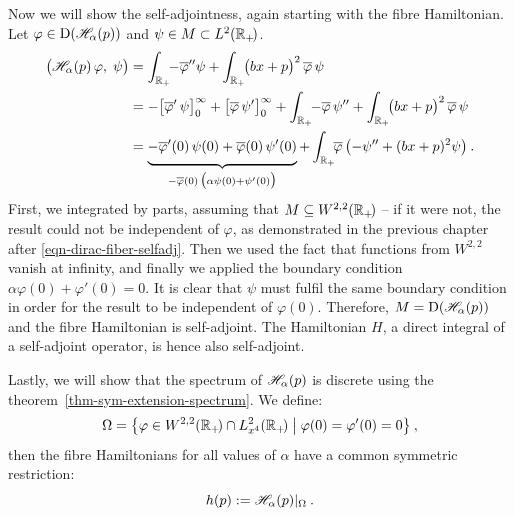 Now we will show the self-adjointness, again starting with the fibre Hamiltonian. Let $\varphi \in \mathrm{D}(\mathscr{H}_\alpha(p))$ and $\psi \in M \subset L^2(\mathbb{R}_+\!)$.
\begin{align*}
    \big(\Hf_\alpha(p) \, \varphi, \; \psi \big)
    &= \int_{\R_+}\!\! -\overline\varphi'' \psi + \int_{\R_+}\!\! \big(bx + p\big)^2 \, \overline\varphi \, \psi \\
    &= - \big[ \overline\varphi' \, \psi \big]_0^\infty
    + \big[ \overline\varphi \, \psi' \big]_0^\infty
    + \int_{\R_+}\!\! -\overline\varphi \, \psi'' + \int_{\R_+}\!\! \big(bx + p\big)^2 \, \overline\varphi \, \psi \\
    &= \underbrace{
        - \overline\varphi'(0) \, \psi(0)
        + \overline\varphi(0) \, \psi'(0)
        \vphantom{\Big|}
    }_{
        -\overline\varphi(0) \,
        \big( \alpha \psi(0) + \psi'(0) \big)
    }
    + \int_{\R_+}\!\! \overline\varphi \, \big( {-\psi''} + (bx+p)^2 \psi \big) \: .
\end{align*}
First, we integrated by parts, assuming that $M\subseteq W^{2,2}(\mathbb{R}_+\!)$ ­– if it were not, the result could not be independent of $\varphi$, as demonstrated in the previous chapter after \eqref{eqn-dirac-fiber-selfadj}. Then we used the fact that functions from $W^{2,2}$ vanish at infinity, and finally we applied the boundary condition $\alpha \varphi(0) + \varphi'(0) = 0$. It is clear that $\psi$ must fulfil the same boundary condition in order for the result to be independent of $\varphi(0)$. Therefore, $M=\mathrm{D}(\mathscr{H}_\alpha(p))$ and the fibre Hamiltonian is self-adjoint. The Hamiltonian $H$, a direct integral of a self-adjoint operator, is hence also self-adjoint.

Lastly, we will show that the spectrum of $\mathscr{H}_\alpha(p)$ is discrete using the theorem~\ref{thm-sym-extension-spectrum}. We define:
\begin{equation*}
    \Omega = \big\{ \varphi \in W^{2,2}(\mathbb{R}_+\!) \cap L^2_{x^4}(\mathbb{R}_+\!) \;\big|\; \varphi(0) = \varphi'(0) = 0 \big\}
    \: ,
\end{equation*}
then the fibre Hamiltonians for all values of $\alpha$ have a common symmetric restriction:
\begin{equation*}
    h(p) := \mathscr{H}_\alpha(p) |_\Omega
    \: .
\end{equation*}

